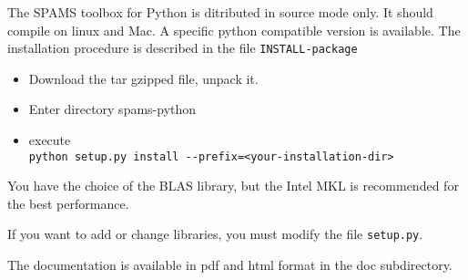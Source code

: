 The SPAMS toolbox for Python is ditributed in source mode only.
It should compile on linux and Mac. A specific python compatible version
is available.
The installation procedure is described in the file \verb=INSTALL-package=
\begin{itemize}
\item Download the tar gzipped file, unpack it.
\item Enter directory spams-python
\item execute \\
  \verb;python setup.py install --prefix=<your-installation-dir>;
\end{itemize}

You have the choice of the BLAS library, but the Intel
MKL is recommended for the best performance.

If you want to add or change libraries, you must modify
the file \verb=setup.py=.

The documentation is available in pdf and html format in the doc subdirectory.
